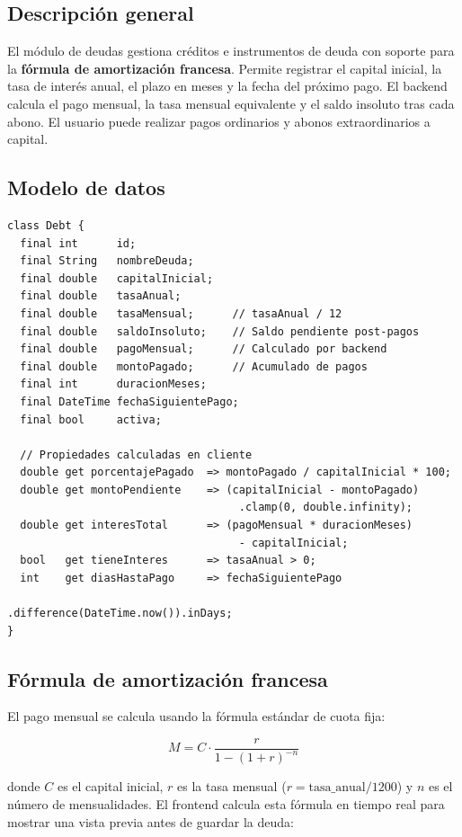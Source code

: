 \documentclass[12pt, letterpaper]{article}
\begin{document}
\subsection{Descripción general}

El módulo de deudas gestiona créditos e instrumentos de deuda con soporte
para la \textbf{fórmula de amortización francesa}. Permite registrar el
capital inicial, la tasa de interés anual, el plazo en meses y la fecha
del próximo pago. El backend calcula el pago mensual, la tasa mensual
equivalente y el saldo insoluto tras cada abono. El usuario puede realizar
pagos ordinarios y abonos extraordinarios a capital.

\subsection{Modelo de datos}

\begin{lstlisting}
class Debt {
  final int      id;
  final String   nombreDeuda;
  final double   capitalInicial;
  final double   tasaAnual;
  final double   tasaMensual;      // tasaAnual / 12
  final double   saldoInsoluto;    // Saldo pendiente post-pagos
  final double   pagoMensual;      // Calculado por backend
  final double   montoPagado;      // Acumulado de pagos
  final int      duracionMeses;
  final DateTime fechaSiguientePago;
  final bool     activa;

  // Propiedades calculadas en cliente
  double get porcentajePagado  => montoPagado / capitalInicial * 100;
  double get montoPendiente    => (capitalInicial - montoPagado)
                                    .clamp(0, double.infinity);
  double get interesTotal      => (pagoMensual * duracionMeses)
                                    - capitalInicial;
  bool   get tieneInteres      => tasaAnual > 0;
  int    get diasHastaPago     => fechaSiguientePago
                                    .difference(DateTime.now()).inDays;
}
\end{lstlisting}

\subsection{Fórmula de amortización francesa}

El pago mensual se calcula usando la fórmula estándar de cuota fija:

\[
  M = C \cdot \frac{r}{1 - (1 + r)^{-n}}
\]

donde $C$ es el capital inicial, $r$ es la tasa mensual ($r = \text{tasa\_anual} / 1200$)
y $n$ es el número de mensualidades. El frontend calcula esta fórmula en
tiempo real para mostrar una vista previa antes de guardar la deuda:
\end{document}

